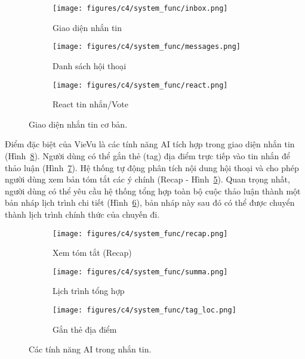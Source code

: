 \begin{figure}[H]
    \centering
    \begin{subfigure}{0.326\textwidth}
        \texttt{[image: figures/c4/system\_func/inbox.png]}
        \caption{Giao diện nhắn tin}
        \label{fig:func_messages}
    \end{subfigure}
    \hfill
    \begin{subfigure}{0.326\textwidth}
        \texttt{[image: figures/c4/system\_func/messages.png]}
        \caption{Danh sách hội thoại}
        \label{fig:func_inbox}
    \end{subfigure}
    \hfill
    \begin{subfigure}{0.326\textwidth}
        \texttt{[image: figures/c4/system\_func/react.png]}
        \caption{React tin nhắn/Vote}
        \label{fig:func_react}
    \end{subfigure}
    \caption{Giao diện nhắn tin cơ bản.}
    \label{fig:messaging-1}
\end{figure}

\noindent \noindent Điểm đặc biệt của VieVu là các tính năng AI tích hợp trong giao diện nhắn tin (Hình~\ref{fig:messaging-2}). Người dùng có thể gắn thẻ (tag) địa điểm trực tiếp vào tin nhắn để thảo luận (Hình~\ref{fig:func_tag_loc}). Hệ thống tự động phân tích nội dung hội thoại và cho phép người dùng xem bản tóm tắt các ý chính (Recap - Hình~\ref{fig:func_recap}). Quan trọng nhất, người dùng có thể yêu cầu hệ thống tổng hợp toàn bộ cuộc thảo luận thành một bản nháp lịch trình chi tiết (Hình~\ref{fig:func_summary_result}), bản nháp này sau đó có thể được chuyển thành lịch trình chính thức của chuyến đi.

\begin{figure}[H]
    \centering
    \begin{subfigure}{0.326\textwidth}
        \texttt{[image: figures/c4/system\_func/recap.png]}
        \caption{Xem tóm tắt (Recap)}
        \label{fig:func_recap}
    \end{subfigure}
    \hfill
    \begin{subfigure}{0.326\textwidth}
        \texttt{[image: figures/c4/system\_func/summa.png]}
        \caption{Lịch trình tổng hợp}
        \label{fig:func_summary_result}
    \end{subfigure}
    \hfill
    \begin{subfigure}{0.326\textwidth}
        \texttt{[image: figures/c4/system\_func/tag\_loc.png]}
        \caption{Gắn thẻ địa điểm}
        \label{fig:func_tag_loc}
    \end{subfigure}
    \caption{Các tính năng AI trong nhắn tin.}
    \label{fig:messaging-2}
\end{figure}

